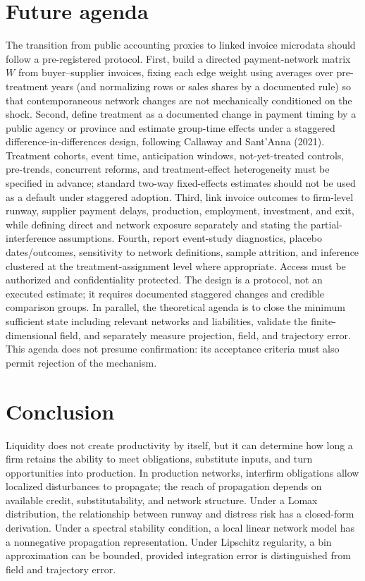 \documentclass[11pt,a4paper]{article}
\begin{document}
\section{Future agenda}
The transition from public accounting proxies to linked invoice microdata should follow a pre-registered protocol. First, build a directed payment-network matrix $W$ from buyer--supplier invoices, fixing each edge weight using averages over pre-treatment years (and normalizing rows or sales shares by a documented rule) so that contemporaneous network changes are not mechanically conditioned on the shock. Second, define treatment as a documented change in payment timing by a public agency or province and estimate group-time effects under a staggered difference-in-differences design, following Callaway and Sant’Anna (2021). Treatment cohorts, event time, anticipation windows, not-yet-treated controls, pre-trends, concurrent reforms, and treatment-effect heterogeneity must be specified in advance; standard two-way fixed-effects estimates should not be used as a default under staggered adoption. Third, link invoice outcomes to firm-level runway, supplier payment delays, production, employment, investment, and exit, while defining direct and network exposure separately and stating the partial-interference assumptions. Fourth, report event-study diagnostics, placebo dates/outcomes, sensitivity to network definitions, sample attrition, and inference clustered at the treatment-assignment level where appropriate. Access must be authorized and confidentiality protected. The design is a protocol, not an executed estimate; it requires documented staggered changes and credible comparison groups. In parallel, the theoretical agenda is to close the minimum sufficient state including relevant networks and liabilities, validate the finite-dimensional field, and separately measure projection, field, and trajectory error. This agenda does not presume confirmation: its acceptance criteria must also permit rejection of the mechanism.

\section{Conclusion}
Liquidity does not create productivity by itself, but it can determine how long a firm retains the ability to meet obligations, substitute inputs, and turn opportunities into production. In production networks, interfirm obligations allow localized disturbances to propagate; the reach of propagation depends on available credit, substitutability, and network structure. Under a Lomax distribution, the relationship between runway and distress risk has a closed-form derivation. Under a spectral stability condition, a local linear network model has a nonnegative propagation representation. Under Lipschitz regularity, a bin approximation can be bounded, provided integration error is distinguished from field and trajectory error.
\end{document}
